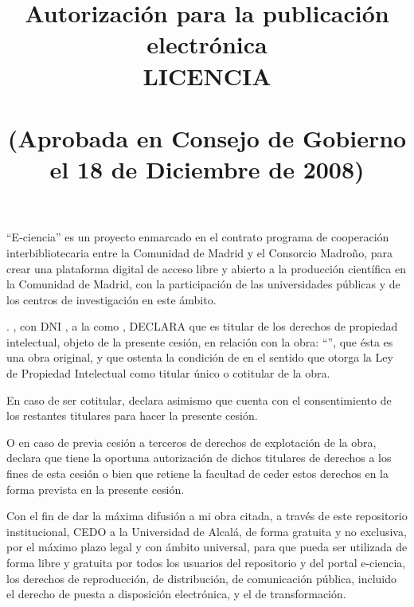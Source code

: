 \documentclass[12pt,a4paper,oneside]{article}
\title{Autorización \wordAutorDelOrDeLa{} \wordAutorOrAutora{} para la publicación
  electrónica \\ LICENCIA\\~\\ \large(Aprobada en Consejo de Gobierno el 18 de Diciembre de 2008)}
\date{}                                            %
\begin{document}

\maketitle 

\thispagestyle{plain}
\fancyhf{} %
\fancyfoot[C]{\thepage} %



``E-ciencia'' es un proyecto enmarcado en el contrato programa de cooperación
interbibliotecaria entre la Comunidad de Madrid y el Consorcio Madroño, para crear una
plataforma digital de acceso libre y abierto a la producción científica en la Comunidad de
Madrid, con la participación de las universidades públicas y de los centros de
investigación en este ámbito.

\expandafter\makefirstuc\expandafter{\wordAutorElOrLa}
\wordAutorOrAutora{} \wordAutorDonOrDona{}. \myAuthorFullName, con DNI
\myAuthorDNI, \wordAutorAdscritoOrAdscrita{} a la
\myUniversity{} como \wordAlumnoOrAlumna, DECLARA que es \wordAutorElOrLa{} titular de los
derechos de propiedad intelectual, objeto de la presente cesión, en
relación con la obra: ``\myBookTitle'', que ésta es una obra original, y
que ostenta la condición de \wordAutorOrAutora{} en el sentido que
otorga la Ley de Propiedad Intelectual como titular único o cotitular de
la obra.

En caso de ser cotitular, \wordAutorElOrLa{} \wordAutorOrAutora{} declara
asimismo que cuenta con el consentimiento de los restantes titulares
para hacer la presente cesión.

O en caso de previa cesión a terceros de derechos de explotación de la
obra, \wordAutorElOrLa{} \wordAutorOrAutora{} declara que tiene la
oportuna autorización de dichos titulares de derechos a los fines de
esta cesión o bien que retiene la facultad de ceder estos derechos en la
forma prevista en la presente cesión.

Con el fin de dar la máxima difusión a mi obra citada, a través de este repositorio
institucional, CEDO a la Universidad de Alcalá, de forma gratuita y no exclusiva, por el
máximo plazo legal y con ámbito universal, para que pueda ser utilizada de forma libre y
gratuita por todos los usuarios del repositorio y del portal e-ciencia, los derechos de
reproducción, de distribución, de comunicación pública, incluido el derecho de puesta a
disposición electrónica, y el de transformación.
\end{document}
